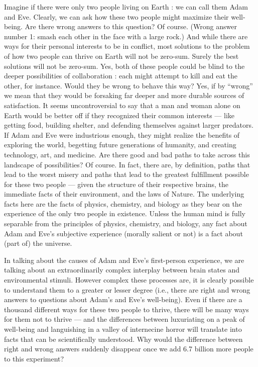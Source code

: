 \documentclass[a4paper,14pt]{extarticle}
\begin{document}
Imagine if there were only two people living on Earth :
we can call them Adam and Eve.
Clearly, we can ask how these two people might maximize their well-being.
Are there wrong answers to this question?
Of course.
(Wrong answer number 1: smash each other in the face with a large rock.)
And while there are ways for their personal interests to be in conflict, most solutions to the problem of how two people can thrive on Earth will not be zero-sum.
Surely the best solutions will not be zero-sum.
Yes, both of these people could be blind to the deeper possibilities of collaboration :
each might attempt to kill and eat the other, for instance.
Would they be wrong to behave this way?
Yes, if by ``wrong'' we mean that they would be forsaking far deeper and more durable sources of satisfaction.
It seems uncontroversial to say that a man and woman alone on Earth would be better off if they recognized their common interests --- like getting food, building shelter, and defending themselves against larger predators.
If Adam and Eve were industrious enough, they might realize the benefits of exploring the world, begetting future generations of humanity, and creating technology, art, and medicine.
Are there good and bad paths to take across this landscape of possibilities?
Of course. In fact, there are, by definition, paths that lead to the worst misery and paths that lead to the greatest fulfillment possible for these two people --- given the structure of their respective brains, the immediate facts of their environment, and the laws of Nature.
The underlying facts here are the facts of physics, chemistry, and biology as they bear on the experience of the only two people in existence.
Unless the human mind is fully separable from the principles of physics, chemistry, and biology, any fact about Adam and Eve's subjective experience (morally salient or not) is a fact about (part of) the universe.

In talking about the causes of Adam and Eve's first-person experience, we are talking about an extraordinarily complex interplay between brain states and environmental stimuli.
However complex these processes are, it is clearly possible to understand them to a greater or lesser degree (i.e., there are right and wrong answers to questions about Adam's and Eve's well-being).
Even if there are a thousand different ways for these two people to thrive, there will be many ways for them not to thrive --- and the differences between luxuriating on a peak of well-being and languishing in a valley of internecine horror will translate into facts that can be scientifically understood.
Why would the difference between right and wrong answers suddenly disappear once we add 6.7 billion more people to this experiment?
\end{document}
